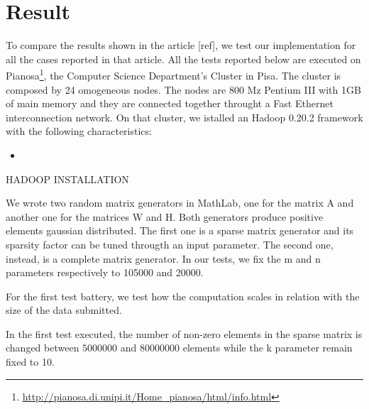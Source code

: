 \section{Result}
\label{result}

To compare the results shown in the article [ref], we test our implementation for all the cases reported in that article. All the tests reported below are executed on Pianosa\footnote{\url{http://pianosa.di.unipi.it/Home_pianosa/html/info.html}}, the Computer Science Department's Cluster in Pisa. The cluster is composed by 24 omogeneous nodes. The nodes are 800 Mz Pentium III with 1GB of main memory and they are connected together throught a Fast Ethernet interconnection network. On that cluster, we istalled an Hadoop 0.20.2 framework with the following characteristics:

\begin{itemize}
\item
\end{itemize}
HADOOP INSTALLATION




We wrote two random matrix generators in MathLab, one for the matrix A and another one for the matrices W and H. Both generators produce positive elements gaussian distributed. The first one is a sparse matrix generator and its sparsity factor can be tuned througth an input parameter. The second one, instead, is a complete matrix generator. In our tests, we fix the m and n parameters respectively to 105000 and 20000.

For the first test battery, we test how the computation scales in relation with the size of the data submitted. 

In the first test executed, the number of non-zero elements in the sparse matrix is changed between $5000000$ and $80000000$ elements while the k parameter remain fixed to 10. 


